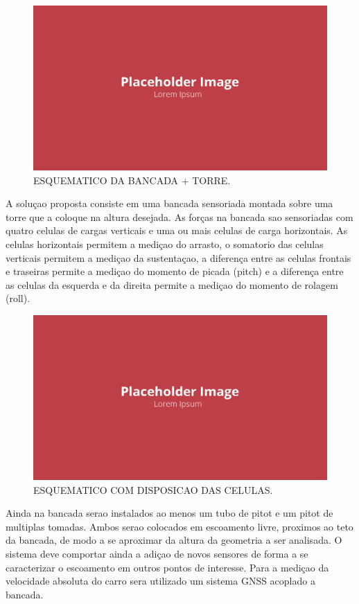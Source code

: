 \begin{figure}[!ht]
    \centering
    \includegraphics[width=.8\linewidth]{figuras/placeholder.png}
    \caption{ESQUEMATICO DA BANCADA + TORRE\cite{autor}.}
    \label{fig:placeholder}
\end{figure}

A soluçao proposta consiste em uma bancada sensoriada montada sobre uma torre que a coloque na altura desejada. As forças na bancada sao sensoriadas com quatro celulas de cargas verticais e uma ou mais celulas de carga horizontais. As celulas horizontais permitem a mediçao do arrasto, o somatorio das celulas verticais permitem a mediçao da sustentaçao, a diferença entre as celulas frontais e traseiras permite a mediçao do momento de picada (pitch) e a diferença entre as celulas da esquerda e da direita permite a mediçao do momento de rolagem (roll).

\begin{figure}[!ht]
    \centering
    \includegraphics[width=.8\linewidth]{figuras/placeholder.png}
    \caption{ESQUEMATICO COM DISPOSICAO DAS CELULAS\cite{autor}.}
    \label{fig:placeholder}
\end{figure}

Ainda na bancada serao instalados ao menos um tubo de pitot e um pitot de multiplas tomadas. Ambos serao colocados em escoamento livre, proximos ao teto da bancada, de modo a se aproximar da altura da geometria a ser analisada. O sistema deve comportar ainda a adiçao de novos sensores de forma a se caracterizar o escoamento em outros pontos de interesse. Para a mediçao da velocidade absoluta do carro sera utilizado um sistema GNSS acoplado a bancada.

